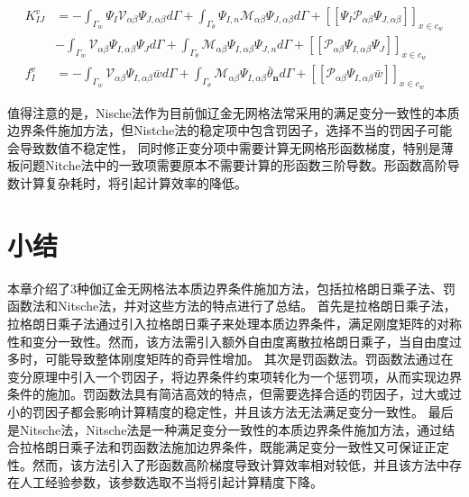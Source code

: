 \begin{subequations}
\begin{align}
 K^v_{IJ}&=-\int_{\Gamma_w}\Psi_I\mathcal{V}_{\alpha\beta}\Psi_{J,\alpha\beta}d\Gamma+\int_{\Gamma_{\theta}}\Psi_{I,n}\mathcal{M}_{\alpha\beta}\Psi_{J,\alpha\beta}d\Gamma+[[\Psi_I\mathcal{P}_{\alpha\beta}\Psi_{J,\alpha\beta}]]_{x\in{c_w}}\nonumber\\
     &-\int_{\Gamma_w}\mathcal{V}_{\alpha\beta}\Psi_{I,\alpha\beta}\Psi_Jd\Gamma+\int_{\Gamma_{\theta}}\mathcal{M}_{\alpha\beta}\Psi_{I,\alpha\beta}\Psi_{J,n}d\Gamma+[[\mathcal{P}_{\alpha\beta}\Psi_{I,\alpha\beta}\Psi_J]]_{x\in{c_w}}\\
 f_{I}^v&=-\int_{\Gamma_w}\mathcal{V}_{\alpha\beta}\Psi_{I,\alpha\beta}\bar{w}d\Gamma+\int_{\Gamma_{\theta}}\mathcal{M}_{\alpha\beta}\Psi_{I,\alpha\beta}\bar{\theta}_{\pmb n}d\Gamma+[[\mathcal{P}_{\alpha\beta}\Psi_{I,\alpha\beta}\bar{w}]]_{x\in{c_w}}
\end{align}
\end{subequations}
\par
值得注意的是，Nische法作为目前伽辽金无网格法常采用的满足变分一致性的本质边界条件施加方法，但Nistche法的稳定项中包含罚因子，选择不当的罚因子可能会导致数值不稳定性，
同时修正变分项中需要计算无网格形函数梯度，特别是薄板问题Nitche法中的一致项需要原本不需要计算的形函数三阶导数。形函数高阶导数计算复杂耗时，将引起计算效率的降低。
\section{小结}
本章介绍了3种伽辽金无网格法本质边界条件施加方法，包括拉格朗日乘子法、罚函数法和Nitsche法，并对这些方法的特点进行了总结。
首先是拉格朗日乘子法，拉格朗日乘子法通过引入拉格朗日乘子来处理本质边界条件，满足刚度矩阵的对称性和变分一致性。然而，该方法需引入额外自由度离散拉格朗日乘子，当自由度过多时，可能导致整体刚度矩阵的奇异性增加。
其次是罚函数法。罚函数法通过在变分原理中引入一个罚因子，将边界条件约束项转化为一个惩罚项，从而实现边界条件的施加。罚函数法具有简洁高效的特点，但需要选择合适的罚因子，过大或过小的罚因子都会影响计算精度的稳定性，并且该方法无法满足变分一致性。
最后是Nitsche法，Nitsche法是一种满足变分一致性的本质边界条件施加方法，通过结合拉格朗日乘子法和罚函数法施加边界条件，既能满足变分一致性又可保证正定性。然而，该方法引入了形函数高阶梯度导致计算效率相对较低，并且该方法中存在人工经验参数，该参数选取不当将引起计算精度下降。




